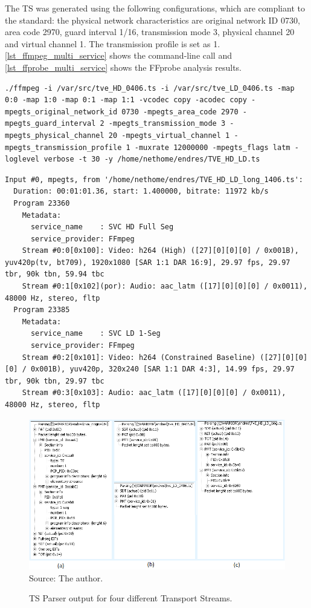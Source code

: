 \documentclass[
	12pt,				%
	openright,			%
	twoside,			%
	a4paper,			%
	brazil,
	french,				%
	english
	]{abntex2}
\begin{document}
The TS was generated using the following configurations, which are compliant to the standard: the physical network characteristics are original network ID 0730, area code 2970, guard interval 1/16, transmission mode 3, physical channel 20 and virtual channel 1. The transmission profile is set as 1. \autoref{lst_ffmpeg_multi_service} shows the command-line call and \autoref{lst_ffprobe_multi_service} shows the FFprobe analysis results.

\begin{lstlisting}[caption={FFmpeg command-line call to generate a multi-service TS}, label={lst_ffmpeg_multi_service}]
./ffmpeg -i /var/src/tve_HD_0406.ts -i /var/src/tve_LD_0406.ts -map 0:0 -map 1:0 -map 0:1 -map 1:1 -vcodec copy -acodec copy -mpegts_original_network_id 0730 -mpegts_area_code 2970 -mpegts_guard_interval 2 -mpegts_transmission_mode 3 -mpegts_physical_channel 20 -mpegts_virtual_channel 1 -mpegts_transmission_profile 1 -muxrate 12000000 -mpegts_flags latm -loglevel verbose -t 30 -y /home/nethome/endres/TVE_HD_LD.ts
\end{lstlisting}

\begin{lstlisting}[caption={FFprobe analysing the multi-service TS.}, label={lst_ffprobe_multi_service}]
Input #0, mpegts, from '/home/nethome/endres/TVE_HD_LD_long_1406.ts':
  Duration: 00:01:01.36, start: 1.400000, bitrate: 11972 kb/s
  Program 23360 
    Metadata:
      service_name    : SVC HD Full Seg
      service_provider: FFmpeg
    Stream #0:0[0x100]: Video: h264 (High) ([27][0][0][0] / 0x001B), yuv420p(tv, bt709), 1920x1080 [SAR 1:1 DAR 16:9], 29.97 fps, 29.97 tbr, 90k tbn, 59.94 tbc
    Stream #0:1[0x102](por): Audio: aac_latm ([17][0][0][0] / 0x0011), 48000 Hz, stereo, fltp
  Program 23385 
    Metadata:
      service_name    : SVC LD 1-Seg
      service_provider: FFmpeg
    Stream #0:2[0x101]: Video: h264 (Constrained Baseline) ([27][0][0][0] / 0x001B), yuv420p, 320x240 [SAR 1:1 DAR 4:3], 14.99 fps, 29.97 tbr, 90k tbn, 29.97 tbc
    Stream #0:3[0x103]: Audio: aac_latm ([17][0][0][0] / 0x0011), 48000 Hz, stereo, fltp
\end{lstlisting}

\begin{figure}[!h]
\centering
\caption{TS Parser output for four different Transport Streams.}
\includegraphics[width=0.9\linewidth]{figuras/ts_parser_tve_orig_remux.png}
\\Source: The author.
\label{fig:ts_parser_tve_orig_remux}
\end{figure}
\end{document}

